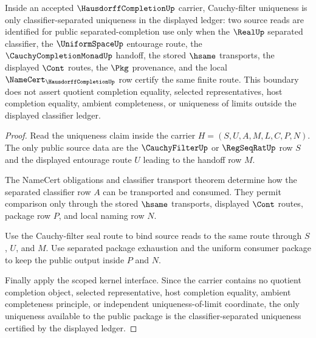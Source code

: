 \begin{theorem}
\label{thm:hausdorff-completion-cauchy-filter-uniqueness}
Inside an accepted $\HausdorffCompletionUp$ carrier, Cauchy-filter uniqueness is only classifier-separated uniqueness in the displayed ledger: two source reads are identified for public separated-completion use only when the $\RealUp$ separated classifier, the $\UniformSpaceUp$ entourage route, the $\CauchyCompletionMonadUp$ handoff, the stored $\hsame$ transports, the displayed $\Cont$ routes, the $\Pkg$ provenance, and the local $\NameCert_{\HausdorffCompletionUp}$ row certify the same finite route. This boundary does not assert quotient completion equality, selected representatives, host completion equality, ambient completeness, or uniqueness of limits outside the displayed classifier ledger.
\end{theorem}
\begin{proof}
Read the uniqueness claim inside the carrier $H=(S,U,A,M,L,C,P,N)$. The only public source data are the $\CauchyFilterUp$ or $\RegSeqRatUp$ row $S$ and the displayed entourage route $U$ leading to the handoff row $M$.

The NameCert obligations and classifier transport theorem determine how the separated classifier row $A$ can be transported and consumed. They permit comparison only through the stored $\hsame$ transports, displayed $\Cont$ routes, package row $P$, and local naming row $N$.

Use the Cauchy-filter seal route to bind source reads to the same route through $S$, $U$, and $M$. Use separated package exhaustion and the uniform consumer package to keep the public output inside $P$ and $N$.

Finally apply the scoped kernel interface. Since the carrier contains no quotient completion object, selected representative, host completion equality, ambient completeness principle, or independent uniqueness-of-limit coordinate, the only uniqueness available to the public package is the classifier-separated uniqueness certified by the displayed ledger.
\end{proof}

